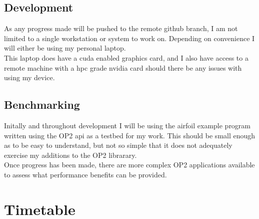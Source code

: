 \documentclass[11pt]{article}
\begin{document}
\subsection*{Development}
As any progress made will be pushed to the remote github branch, I am not limited to a single workstation or system to work on. Depending on convenience I will either be using my personal laptop.\\
This laptop does have a cuda enabled graphics card, and I also have access to a remote machine with a hpc grade nvidia card should there be any issues with using my device.
\subsection*{Benchmarking}
Initally and throughout development I will be using the airfoil\cite{airfoil} example program written using the OP2 api as a testbed for my work. This should be small enough as to be easy to understand, but not so simple that it does not adequately exercise my additions to the OP2 librarary.\\
Once progress has been made, there are more complex OP2 applications available to assess what performance benefits can be provided.

\section*{Timetable}
\end{document}
